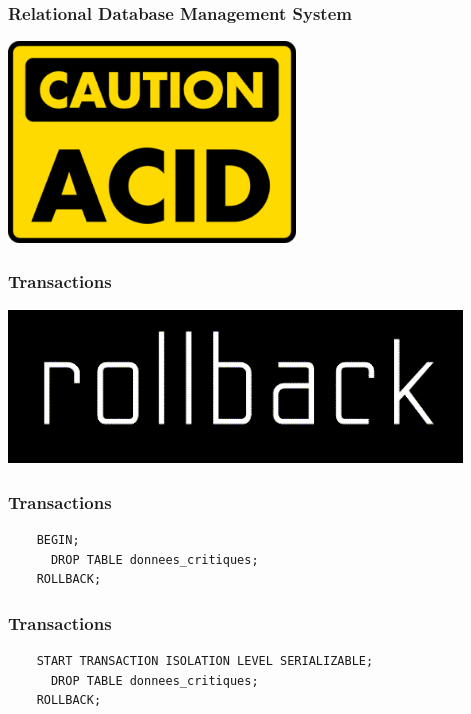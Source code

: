\documentclass{beamer}
\begin{document}
\begin{frame}
  \frametitle{Relational Database Management System}

  \begin{center}
    \includegraphics[height=2.1in]{caution_acid.png}
  \end{center}
\end{frame}

\begin{frame}
  \frametitle{Transactions}

  \begin{center}
    \includegraphics[height=1.6in]{rollback-wordmark.png}
  \end{center}
\end{frame}

\begin{frame}[fragile]
  \frametitle{Transactions}

  \begin{verbatim}
    BEGIN;
      DROP TABLE donnees_critiques;
    ROLLBACK;
  \end{verbatim}
\end{frame}

\begin{frame}[fragile]
  \frametitle{Transactions}

  \begin{verbatim}
    START TRANSACTION ISOLATION LEVEL SERIALIZABLE;
      DROP TABLE donnees_critiques;
    ROLLBACK;
  \end{verbatim}
\end{frame}
\end{document}
